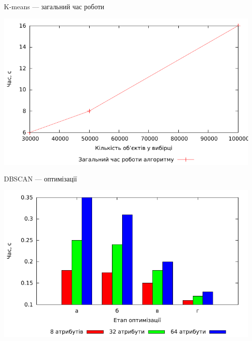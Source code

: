 \documentclass{beamer}
\begin{document}
    
    \begin{frame}{K-means --- загальний час роботи}
        \begin{center}
            \includegraphics[scale=0.8]{kmeans_complexity.pdf}
        \end{center}
    \end{frame}
    
    
    \begin{frame}{DBSCAN --- оптимізації}
        \begin{center}
            \includegraphics[scale=0.8]{dbscan_compare.pdf}
        \end{center}
    \end{frame}
    
\end{document}
